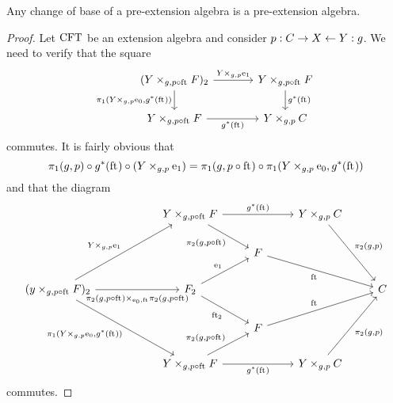 \begin{lem}\label{cobesys-preext}
Any change of base of a pre-extension algebra is a pre-extension algebra.
\end{lem}

\begin{proof}
Let $\mathrm{CFT}$ be an extension algebra and consider $p:C\rightarrow X\leftarrow Y:g$.
We need to verify that the square
\begin{equation*}
\begin{tikzcd}[column sep=large]
(\pullback{Y}{\stesysf}{g}{p\circ\eft})_2
  \ar{r}{\cobesys{Y}{\efamext}{g}{p}} 
  \ar{d}[swap]{\pullbackpr{1}{\cobesys{Y}{\ectxext}{g}{p}}{g^\ast(\eft)}} 
  & 
\pullback{Y}{\stesysf}{g}{p\circ\eft}
  \ar{d}{g^\ast(\eft)}
  \\
\pullback{Y}{\stesysf}{g}{p\circ\eft}
  \ar{r}[swap]{g^\ast(\eft)} 
  & 
\pullback{Y}{\stesysc}{g}{p}
\end{tikzcd}
\end{equation*}
commutes. It is fairly obvious that
\begin{equation*}
\pullbackpr{1}{g}{p}\circ g^\ast(\eft)\circ (\cobesys{Y}{\efamext}{g}{p})
  =
\pullbackpr{1}{g}{p\circ\eft}\circ \pullbackpr{1}{\cobesys{Y}{\ectxext}{g}{p}}{g^\ast(\eft)}
\end{equation*}
and that the diagram
\begin{equation*}
\begin{tikzcd}
  {}&
  {}&
\pullback{Y}{\stesysf}{g}{p\circ\eft}
  \ar{rr}{g^\ast(\eft)}
  \ar{dr}[swap]{\pullbackpr{2}{g}{p\circ\eft}}
  &
  {}&
\pullback{Y}{\stesysc}{g}{p}
  \ar{ddr}{\pullbackpr{2}{g}{p}}
  \\
  {}&
  {}&
  {}&
\stesysf
  \ar{drr}[swap]{\eft}
  \\
(\pullback{y}{\stesysf}{g}{p\circ\eft})_2
  \ar{uurr}{\cobesys{Y}{\efamext}{g}{p}}
  \ar{rr}[swap,yshift=-.5ex]{\pullback{\pullbackpr{2}{g}{p\circ\eft}}{\pullbackpr{2}{g}{p\circ\eft}}{\ectxext}{\eft}}
  \ar{ddrr}[swap]{\pullbackpr{1}{\cobesys{Y}{\ectxext}{g}{p}}{g^\ast(\eft)}}
  &
  {}&
\stesysf_2
  \ar{ur}{\efamext}
  \ar{dr}[swap]{\eft[2]}
  &
  {}&
  {}&
\stesysc
  \\
  {}&
  {}&
  {}&
\stesysf
  \ar{urr}{\eft}
  \\
  {}&
  {}&
\pullback{Y}{\stesysf}{g}{p\circ\eft}
  \ar{rr}[swap]{g^\ast(\eft)}
  \ar{ur}{\pullbackpr{2}{g}{p\circ\eft}}
  &
  {}&
\pullback{Y}{\stesysc}{g}{p}
  \ar{uur}[swap]{\pullbackpr{2}{g}{p}}
\end{tikzcd}
\end{equation*}
commutes.
\end{proof}

